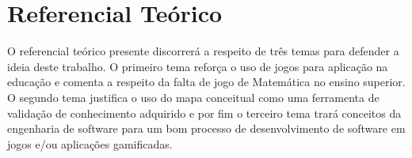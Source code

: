 \chapter[Referencial Teórico]{Referencial Teórico}
O referencial teórico presente discorrerá a respeito de três temas para defender a ideia deste trabalho. O primeiro tema reforça o uso de jogos para aplicação na educação e comenta a respeito da falta de jogo de Matemática no ensino superior. O segundo tema justifica o uso do mapa conceitual como uma ferramenta de validação de conhecimento adquirido e por fim o terceiro tema trará conceitos da engenharia de software para um bom processo de desenvolvimento de software em jogos e/ou aplicações gamificadas. 





\begin{comment}
Existem estudos com referencial teórico apoiando o uso de gamificação em vários contextos e utilizando dos benefícios oferecidos por ela. Exemplo de contextos como marketing, saúde, educação e etc. A gamificação é também utilizada em contextos de ensino de matemática (embora não sejam muitos os resultados encontrados para universidades). Em alguns casos são utilizados a tecnologia junto da gamificação nos contextos acima citado. É dito que a tecnologia e jogos contribuem para ajudar no engajamento e chamar atenção das pessoas e dos estudantes.
Tem um estudo dizendo que não há limites para a idade de jogar, brincar e se divertir. Por isso jogo e gamificação podem ser possíveis estratégias para utilizar em comunhão de tecnologias visando o ensino de EDO 1ª ordem para estudantes do ensino superior.
 
 \end{comment}

